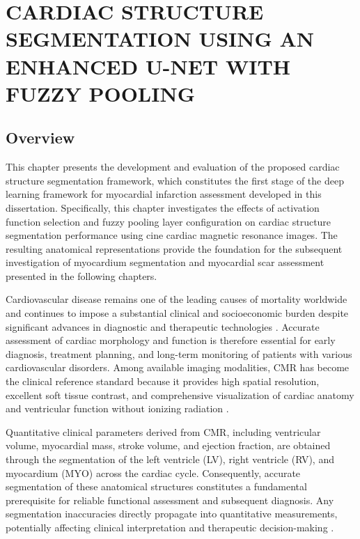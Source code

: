 \chapter{CARDIAC STRUCTURE SEGMENTATION USING AN ENHANCED U-NET WITH FUZZY POOLING}
\label{chap:4}

\section{Overview}
\label{sec:ch4-intro-overview}

This chapter presents the development and evaluation of the proposed cardiac structure segmentation framework, which constitutes the first stage of the deep learning framework for myocardial infarction assessment developed in this dissertation. Specifically, this chapter investigates the effects of activation function selection and fuzzy pooling layer configuration on cardiac structure segmentation performance using cine cardiac magnetic resonance images. The resulting anatomical representations provide the foundation for the subsequent investigation of myocardium segmentation and myocardial scar assessment presented in the following chapters.

Cardiovascular disease remains one of the leading causes of mortality worldwide and continues to impose a substantial clinical and socioeconomic burden despite significant advances in diagnostic and therapeutic technologies \citep{Tsao2022,WHO2021}. Accurate assessment of cardiac morphology and function is therefore essential for early diagnosis, treatment planning, and long-term monitoring of patients with various cardiovascular disorders. Among available imaging modalities, CMR has become the clinical reference standard because it provides high spatial resolution, excellent soft tissue contrast, and comprehensive visualization of cardiac anatomy and ventricular function without ionizing radiation \citep{Agrawal2020}.

Quantitative clinical parameters derived from CMR, including ventricular volume, myocardial mass, stroke volume, and ejection fraction, are obtained through the segmentation of the left ventricle (LV), right ventricle (RV), and myocardium (MYO) across the cardiac cycle. Consequently, accurate segmentation of these anatomical structures constitutes a fundamental prerequisite for reliable functional assessment and subsequent diagnosis. Any segmentation inaccuracies directly propagate into quantitative measurements, potentially affecting clinical interpretation and therapeutic decision-making \citep{Petitjean2011,Bernard2018}.

